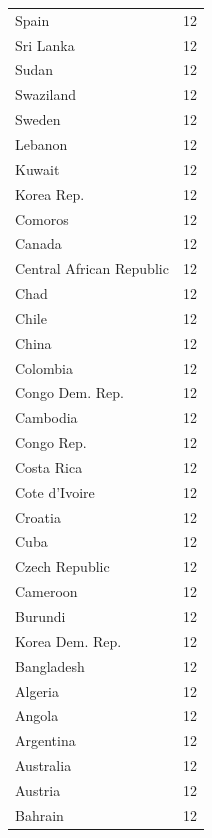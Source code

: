 \documentclass[
  letterpaper,
  DIV=11,
  numbers=noendperiod]{scrreprt}
\begin{document}
\begin{tabular}{lr}
Spain                    &       12 \\
Sri Lanka                &       12 \\
Sudan                    &       12 \\
Swaziland                &       12 \\
Sweden                   &       12 \\
Lebanon                  &       12 \\
Kuwait                   &       12 \\
Korea Rep.               &       12 \\
Comoros                  &       12 \\
Canada                   &       12 \\
Central African Republic &       12 \\
Chad                     &       12 \\
Chile                    &       12 \\
China                    &       12 \\
Colombia                 &       12 \\
Congo Dem. Rep.          &       12 \\
Cambodia                 &       12 \\
Congo Rep.               &       12 \\
Costa Rica               &       12 \\
Cote d'Ivoire            &       12 \\
Croatia                  &       12 \\
Cuba                     &       12 \\
Czech Republic           &       12 \\
Cameroon                 &       12 \\
Burundi                  &       12 \\
Korea Dem. Rep.          &       12 \\
Bangladesh               &       12 \\
Algeria                  &       12 \\
Angola                   &       12 \\
Argentina                &       12 \\
Australia                &       12 \\
Austria                  &       12 \\
Bahrain                  &       12 \\

\end{tabular}
\end{document}
